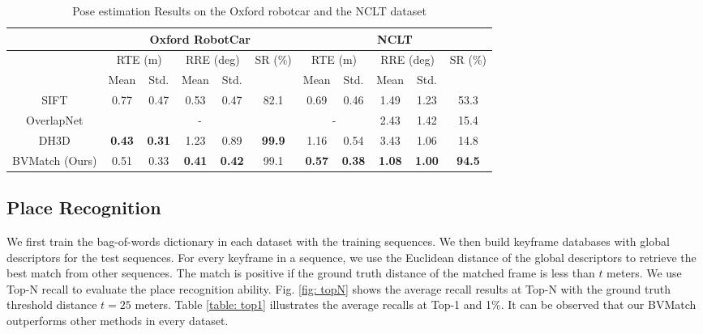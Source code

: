 \documentclass[letterpaper, 10 pt, journal, twoside]{IEEEtran}
\begin{document}
\begin{table*}[!hbp]
	\renewcommand\arraystretch{1.2}
	\renewcommand\tabcolsep{5pt}
	\newcommand{\tabincell}[2]{\begin{tabular}{@{}#1@{}}#2\end{tabular}}
	\begin{center}
		\caption{Pose estimation Results  on the Oxford robotcar and  the NCLT dataset}
		\label{table: pose estimation}
		\begin{tabular}{|c|c|c|c|c|c|c|c|c|c|c|}
			\hline\hline
			& \multicolumn{5}{c|}{Oxford RobotCar} & \multicolumn{5}{c|}{NCLT} \\ \hline
			& \multicolumn{2}{c|}{RTE (m)}        &  \multicolumn{2}{c|}{RRE (deg)}       &  SR (\%)          &  \multicolumn{2}{c|}{RTE (m)} & \multicolumn{2}{c|}{RRE (deg)} & SR (\%)          \\ \hline
			&Mean&Std. & Mean&Std. &  & Mean&Std. & Mean&Std. &    \\ \hline
			SIFT \cite{2004Distinctive}   & {0.77}&{0.47} & 0.53 &0.47 & {82.1} & 0.69&0.46 & 1.49&1.23 &53.3    \\ \hline
			OverlapNet \cite{chen2020overlapnet}   & \multicolumn{5}{c|}{-}& \multicolumn{2}{c|}{-} & 2.43&1.42  & 15.4        \\ \hline
			DH3D \cite{du2020dh3d}   & \textbf{0.43}&\textbf{0.31} & 1.23&0.89 & \textbf{99.9} & 1.16&0.54 & 3.43&1.06 &14.8    \\ \hline
			BVMatch (Ours) & 0.51&0.33 & \textbf{0.41}&\textbf{0.42}  & 99.1 &  \textbf{0.57}&\textbf{0.38} & \textbf{1.08}&\textbf{1.00}  & \textbf{94.5}    \\ 
			\hline\hline
		\end{tabular}
	\end{center}
\end{table*}
\subsection{Place Recognition}

We first train the bag-of-words dictionary in each dataset with the training sequences. We then build keyframe databases with global descriptors for the test sequences. For every keyframe in a sequence, we use the Euclidean distance of the global descriptors to retrieve the best match from other sequences. The match is positive if the ground truth distance of the matched frame is less than $t$ meters. We use Top-N recall to evaluate the place recognition ability. Fig. \ref{fig: topN} shows the average recall results at Top-N with the ground truth threshold distance $t=25$ meters. Table \ref{table: top1} illustrates the average recalls at Top-1 and 1\%. It can be observed that our BVMatch outperforms other methods in every dataset. 
\end{document}
